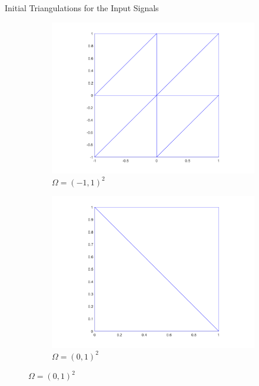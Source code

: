 \begin{frame}{Initial Triangulations for the Input Signals}
  \begin{figure}[!ht]
    \centering
    \begin{subfigure}{.45\linewidth}
      \caption*{Input signal $f$}
      \includegraphics[width=\linewidth]
        {pictures/experiments/settings/f01/triangulation.png}
      \caption*{$\Omega = (-1,1)^2$}
    \end{subfigure}
    \begin{subfigure}{.45\linewidth}
      \caption*{Input signal cameraman}
      \includegraphics[width=\linewidth]
        {pictures/experiments/settings/images/triangulation.png}
      \caption*{$\Omega = (0,1)^2$}
    \end{subfigure}
  \end{figure}
\end{frame}

